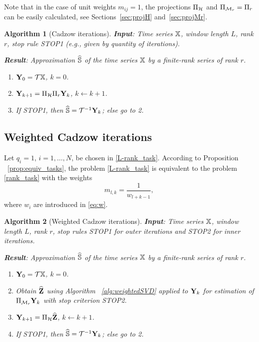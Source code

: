 \documentclass[sii]{ipart}
\newtheorem{algorithm}{Algorithm}
\begin{document}
Note that in the case of unit weights $m_{ij}=1$, the projections $\Pi_{\mathcal{H}}$ and $\Pi_{\mathcal{M}_r}=\Pi_{r}$ can be easily calculated, see Sections~\ref{sec:projH}
and~\ref{sec:projMr}.

\begin{algorithm}[Cadzow iterations]
	\textbf{Input}: Time series $\mathbb{X}$, window length $L$, rank $r$,
	stop rule STOP1 (e.g., given by quantity of iterations).
	
	\textbf{Result}:
	Approximation $\widehat{\mathbb{S}}$ of the time series $\mathbb{X}$ by a finite-rank series of rank $r$.
	
	\begin{enumerate}
		\item
		$\mathbf{Y}_0 = \mathcal{T} \mathbb{X}$, $k=0$.
		\item
		$\mathbf{Y}_{k+1} = \Pi_{\mathcal{H}}  \Pi_{r} \mathbf{Y}_{k}$, $k\leftarrow k+1$.
		\item
		If STOP1, then $\widehat{\mathbb{S}} = \mathcal{T}^{-1} \mathbf{Y}_k$; else go to 2.
	\end{enumerate}
\end{algorithm}


\subsection{Weighted Cadzow iterations}

Let $q_{i}=1$, $i = 1, \ldots, N$, be chosen in \eqref{L-rank_task}. According to Proposition ~\ref{prop:equiv_tasks}, the problem \eqref{L-rank_task} is equivalent to the problem \eqref{rank_task} with the weights
\begin{equation}
\label{Mw}
m_{l, k} = \frac{1}{w_{l + k - 1}},
\end{equation}
where $w_i$ are introduced in \eqref{eq:w}.

\begin{algorithm}[Weighted Cadzow iterations]\label{alg:WCIt}
	\textbf{Input}: Time series $\mathbb{X}$, window length $L$, rank $r$,
	stop rules STOP1 for outer iterations and STOP2 for inner iterations.
	
	\textbf{Result}:
	Approximation $\widehat{\mathbb{S}}$ of the time series $\mathbb{X}$ by a finite-rank series of rank $r$.
	
	\begin{enumerate}
		\item
		$\mathbf{Y}_0 = \mathcal{T} \mathbb{X}$, $k=0$.
		\item
		Obtain $\widehat{\mathbf{Z}}$ using Algorithm ~\ref{alg:weightedSVD} applied to $\mathbf{Y}_k$ for estimation of $\Pi_{\mathcal{M}_r} \mathbf{Y}_{k}$ with stop criterion STOP2.
		\item
		$\mathbf{Y}_{k+1} = \Pi_{\mathcal{H}}  \widehat{\mathbf{Z}}$, $k\leftarrow k+1$.
		\item
		If STOP1, then $\widehat{\mathbb{S}} = \mathcal{T}^{-1} \mathbf{Y}_k$; else go to 2.
	\end{enumerate}
\end{algorithm}
\end{document}
